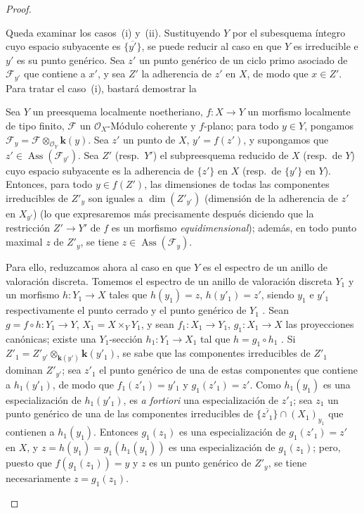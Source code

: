 \begin{proof}
\begin{env}[12.1.1.4]
\label{IV.12.1.1.4}
Queda examinar los casos~(i) y~(ii).
Sustituyendo $Y$ por el subesquema íntegro cuyo espacio subyacente es $\overline{\{y'\}}$, se puede reducir al caso en que $Y$ es irreducible e $y'$ es su punto genérico. Sea $z'$ un punto genérico de un ciclo primo asociado de $\mathcal F_{y'}$
que contiene a $x'$, y sea $Z'$ la adherencia de $z'$ en $X$, de modo que $x\in Z'$.
Para tratar el caso~(i), bastará demostrar la

\begin{proposition}[12.1.1.5]
\label{IV.12.1.1.5}
Sea $Y$ un preesquema localmente noetheriano, $f:X\to Y$ un morfismo localmente de tipo finito, $\mathcal F$ un $\mathcal O_X$-Módulo coherente y $f$-\textup{plano}; para todo $y\in Y$, pongamos $\mathcal F_y=\mathcal F\otimes_{\mathcal O_Y}\boldsymbol{k}(y)$.
Sea $z'$ un punto de $X$, $y'=f(z')$, y supongamos que $z'\in\operatorname{Ass}(\mathcal F_{y'})$.
Sea $Z'$ \textup{(resp.\ $Y'$)} el subpreesquema reducido de $X$ \textup{(resp.\ de $Y$)} cuyo espacio subyacente es la adherencia de $\{z'\}$ en $X$ \textup{(resp.}\ de $\{y'\}$ en $Y$\textup{)}.
Entonces, para todo $y\in f(Z')$, las dimensiones de todas las componentes irreducibles de $Z'_y$ son iguales a $\dim(Z'_{y'})$ \textnormal{(}dimensión de la adherencia de $z'$ en $X_{y'}$\textnormal{)} \textup{(lo que expresaremos más precisamente después  diciendo que la restricción $Z'\to Y'$ de $f$ es un morfismo \emph{equidimensional})}; además, en todo punto maximal $z$ de $Z'_y$, se tiene $z\in\operatorname{Ass}(\mathcal F_y)$.
\end{proposition}

Para ello, reduzcamos ahora al caso en que $Y$ es el espectro de un anillo de valoración discreta.
Tomemos el espectro de un anillo de valoración discreta $Y_1$ y un morfismo $h:Y_1\to X$ tales que $h(y_1)=z$, $h(y'_1)=z'$, siendo $y_1$ e $y'_1$ respectivamente el punto cerrado y el punto genérico de $Y_1$ .
Sean $g=f\circ h:Y_1\to Y$, $X_1=X\times_YY_1$, y sean $f_1:X_1\to Y_1$, $g_1:X_1\to X$ las proyecciones canónicas; existe una $Y_1$-sección $h_1:Y_1\to X_1$ tal que $h=g_1\circ h_1$ .
Si $Z'_1=Z'_{y'}\otimes_{\mathbf{k}(y')}\boldsymbol{k}(y'_1)$, se sabe  que las componentes irreducibles de $Z'_1$ dominan $Z'_{y'}$; sea $z'_1$ el punto genérico de una de estas componentes que contiene a $h_1(y'_1)$, de modo que $f_1(z'_1)=y'_1$ y $g_1(z'_1)=z'$.
Como $h_1(y_1)$ es una especialización de $h_1(y'_1)$, es \emph{a fortiori} una especialización de $z'_1$; sea $z_1$ un punto genérico de una de las componentes irreducibles de $\overline{\{z'_1\}}\cap(X_1)_{y_1}$ que contienen a $h_1(y_1)$.
Entonces $g_1(z_1)$ es una especialización de $g_1(z'_1)=z'$ en $X$, y $z=h(y_1)=g_1(h_1(y_1))$ es una especialización de $g_1(z_1)$; pero, puesto que $f(g_1(z_1))=y$ y $z$ es un punto genérico de $Z'_y$, se tiene necesariamente $z=g_1(z_1)$.


\end{env}
\end{proof}
